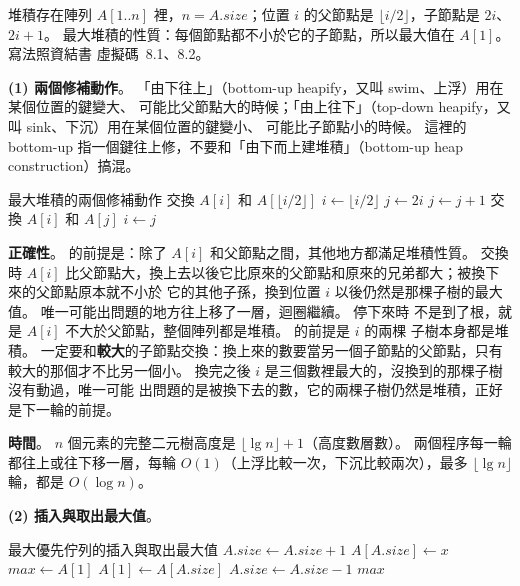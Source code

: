 \begin{pastsoln}
堆積存在陣列 $A[1..n]$ 裡，$n = A.\mathit{size}$；位置 $i$ 的父節點是 $\lfloor i/2 \rfloor$，子節點是
$2i$、$2i + 1$。 最大堆積的性質：每個節點都不小於它的子節點，所以最大值在 $A[1]$。 寫法照資結書
虛擬碼~8.1、8.2。

\textbf{(1) 兩個修補動作}。 「由下往上」（bottom-up heapify，又叫 swim、上浮）用在某個位置的鍵變大、
可能比父節點大的時候；「由上往下」（top-down heapify，又叫 sink、下沉）用在某個位置的鍵變小、
可能比子節點小的時候。 這裡的 bottom-up 指一個鍵往上修，不要和「由下而上建堆積」（bottom-up
heap construction）搞混。

\begin{pseudo}{最大堆積的兩個修補動作}
 
        \State 交換 $A[i]$ 和 $A[\lfloor i/2 \rfloor]$
        \State $i \gets \lfloor i/2 \rfloor$
    \EndWhile
\EndProcedure
\Statex
{} 
        \State $j \gets 2i$ 
            \State $j \gets j + 1$ 
        \EndIf
            \State \Return
        \EndIf
        \State 交換 $A[i]$ 和 $A[j]$
        \State $i \gets j$
    \EndWhile
\EndProcedure
\end{pseudo}

\textbf{正確性}。  的前提是：除了 $A[i]$ 和父節點之間，其他地方都滿足堆積性質。
交換時 $A[i]$ 比父節點大，換上去以後它比原來的父節點和原來的兄弟都大；被換下來的父節點原本就不小於
它的其他子孫，換到位置 $i$ 以後仍然是那棵子樹的最大值。 唯一可能出問題的地方往上移了一層，迴圈繼續。 停下來時
不是到了根，就是 $A[i]$ 不大於父節點，整個陣列都是堆積。  的前提是 $i$ 的兩棵
子樹本身都是堆積。 一定要和\textbf{較大}的子節點交換：換上來的數要當另一個子節點的父節點，只有
較大的那個才不比另一個小。 換完之後 $i$ 是三個數裡最大的，沒換到的那棵子樹沒有動過，唯一可能
出問題的是被換下去的數，它的兩棵子樹仍然是堆積，正好是下一輪的前提。

\textbf{時間}。 $n$ 個元素的完整二元樹高度是 $\lfloor \lg n \rfloor + 1$（高度數層數）。 兩個程序每一輪
都往上或往下移一層，每輪 $O(1)$（上浮比較一次，下沉比較兩次），最多 $\lfloor \lg n \rfloor$ 輪，都是
$O(\log n)$。

\textbf{(2) 插入與取出最大值}。
\begin{pseudo}{最大優先佇列的插入與取出最大值}
 
    \State $A.\mathit{size} \gets A.\mathit{size} + 1$
    \State $A[A.\mathit{size}] \gets x$
    \State {}
\EndProcedure
\Statex
{}
        \State {}
    \EndIf
    \State $\mathit{max} \gets A[1]$
    \State $A[1] \gets A[A.\mathit{size}]$
    \State $A.\mathit{size} \gets A.\mathit{size} - 1$
    \State {}
    \State \Return $\mathit{max}$
\EndFunction
\end{pseudo}


\end{pastsoln}
